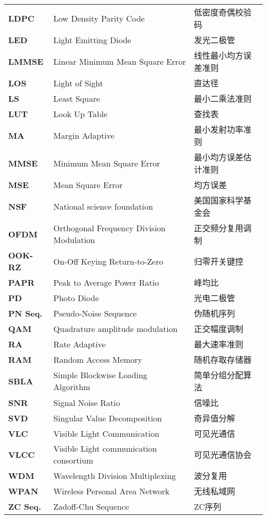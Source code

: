 \begin{terminology}
\begin{longtable}{lll}
\bf{LDPC}	&	Low Density Parity Code	&	低密度奇偶校验码	\\
\bf{LED}	&	Light Emitting Diode	&	发光二极管	\\
\bf{LMMSE}	&	Linear Minimum Mean Square Error	&	线性最小均方误差准则	\\
\bf{LOS}	&	Light of Sight	&	直达径	\\
\bf{LS}	&	Least Square	&	最小二乘法准则	\\
\bf{LUT}	&	Look Up Table	&	查找表	\\
\bf{MA}	&	Margin Adaptive	&	最小发射功率准则	\\
\bf{MMSE}	&	Minimum Mean Square Error	&	最小均方误差估计准则	\\
\bf{MSE}	&	Mean Square Error	&	均方误差	\\
\bf{NSF}	&	National science foundation	&	美国国家科学基金会	\\
\bf{OFDM}	&	Orthogonal Frequency Division Modulation	&	正交频分复用调制	\\
\bf{OOK-RZ}	&	On-Off Keying Return-to-Zero	&	归零开关键控	\\
\bf{PAPR}	&	Peak to Average Power Ratio	&	峰均比	\\
\bf{PD}	&	Photo Diode	&	光电二极管	\\
\bf{PN Seq.}	&	Pseudo-Noise Sequence	&	伪随机序列	\\
\bf{QAM}	&	Quadrature amplitude modulation	&	正交幅度调制	\\
\bf{RA}	&	Rate Adaptive	&	最大速率准则	\\
\bf{RAM}	&	Random Access Memory	&	随机存取存储器	 \\
\bf{SBLA}	&	Simple Blockwise Loading Algorithm	&	简单分组分配算法	\\
\bf{SNR}	&	Signal Noise Ratio	&	信噪比	\\
\bf{SVD}	&	Singular Value Decomposition	&	奇异值分解	\\
\bf{VLC}	&	Visible Light Communication	&	可见光通信	\\
\bf{VLCC}	&	Visible Light communication consortium	&	可见光通信协会	\\
\bf{WDM}	&	Wavelength Division Multiplexing	&	波分复用	\\
\bf{WPAN}	&	Wireless Personal Area Network	&	无线私域网	\\
\bf{ZC Seq.}	&	Zadoff-Chu Sequence	&	ZC序列	\\

    \end{longtable}
\end{terminology}
